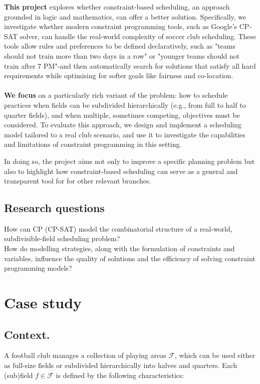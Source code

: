 \documentclass[12pt]{article}
\begin{document}
\textbf{This project} explores whether constraint-based scheduling, an approach grounded in logic and mathematics, can offer a better solution. Specifically, we investigate whether modern constraint programming tools, such as Google's CP-SAT solver, can handle the real-world complexity of soccer club scheduling. These tools allow rules and preferences to be defined declaratively, such as "teams should not train more than two days in a row" or "younger teams should not train after 7 PM"-and then automatically search for solutions that satisfy all hard requirements while optimising for softer goals like fairness and co-location.
\\
\\
\textbf{We focus} on a particularly rich variant of the problem: how to schedule practices when fields can be subdivided hierarchically (e.g., from full to half to quarter fields), and when multiple, sometimes competing, objectives must be considered. To evaluate this approach, we design and implement a scheduling model tailored to a real club scenario, and use it to investigate the capabilities and limitations of constraint programming in this setting.

In doing so, the project aims not only to improve a specific planning problem but also to highlight how constraint-based scheduling can serve as a general and transparent tool for for other relevant branches.
\newpage



\subsection{Research questions}
 How can CP (CP-SAT) model the combinatorial structure of a real-world, subdivisible-field scheduling problem?
\\
 How do modelling strategies, along with the formulation of constraints and variables, influence the quality of solutions and the efficiency of solving constraint programming models?



\section{Case study}

\subsection{Context.}
A football club manages a collection of playing areas $\mathcal{F}$, which can be used either as full-size fields or subdivided hierarchically into halves and quarters. Each (sub)field $f \in \mathcal{F}$ is defined by the following characteristics:
\\
\end{document}
